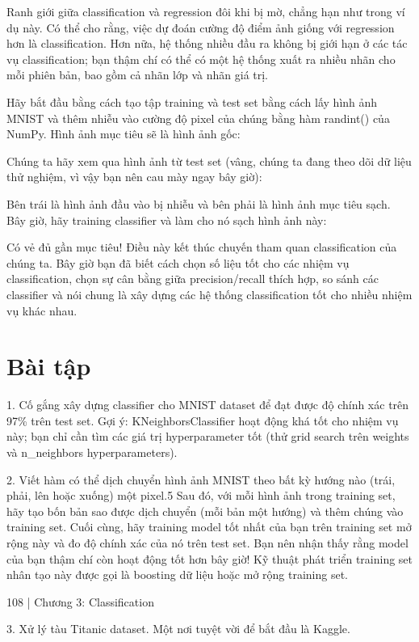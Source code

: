 Ranh giới giữa classification và regression đôi khi bị mờ, chẳng hạn như trong ví dụ này. Có thể cho rằng, việc dự đoán cường độ điểm ảnh giống với regression hơn là classification. Hơn nữa, hệ thống nhiều đầu ra không bị giới hạn ở các tác vụ classification; bạn thậm chí có thể có một hệ thống xuất ra nhiều nhãn cho mỗi phiên bản, bao gồm cả nhãn lớp và nhãn giá trị.

Hãy bắt đầu bằng cách tạo tập training và test set bằng cách lấy hình ảnh MNIST và thêm nhiễu vào cường độ pixel của chúng bằng hàm randint() của NumPy. Hình ảnh mục tiêu sẽ là hình ảnh gốc:

Chúng ta hãy xem qua hình ảnh từ test set (vâng, chúng ta đang theo dõi dữ liệu thử nghiệm, vì vậy bạn nên cau mày ngay bây giờ):

Bên trái là hình ảnh đầu vào bị nhiễu và bên phải là hình ảnh mục tiêu sạch. Bây giờ, hãy training classifier và làm cho nó sạch hình ảnh này:

Có vẻ đủ gần mục tiêu! Điều này kết thúc chuyến tham quan classification của chúng ta. Bây giờ bạn đã biết cách chọn số liệu tốt cho các nhiệm vụ classification, chọn sự cân bằng giữa precision/recall thích hợp, so sánh các classifier và nói chung là xây dựng các hệ thống classification tốt cho nhiều nhiệm vụ khác nhau.

\section{Bài tập}

1. Cố gắng xây dựng classifier cho MNIST dataset để đạt được độ chính xác trên 97\% trên test set. Gợi ý: KNeighborsClassifier hoạt động khá tốt cho nhiệm vụ này; bạn chỉ cần tìm các giá trị hyperparameter tốt (thử grid search trên weights và n\_neighbors hyperparameters).

2. Viết hàm có thể dịch chuyển hình ảnh MNIST theo bất kỳ hướng nào (trái, phải, lên hoặc xuống) một pixel.5 Sau đó, với mỗi hình ảnh trong training set, hãy tạo bốn bản sao được dịch chuyển (mỗi bản một hướng) và thêm chúng vào training set. Cuối cùng, hãy training model tốt nhất của bạn trên training set mở rộng này và đo độ chính xác của nó trên test set. Bạn nên nhận thấy rằng model của bạn thậm chí còn hoạt động tốt hơn bây giờ! Kỹ thuật phát triển training set nhân tạo này được gọi là boosting dữ liệu hoặc mở rộng training set.

108 | Chương 3: Classification

3. Xử lý tàu Titanic dataset. Một nơi tuyệt vời để bắt đầu là Kaggle.

